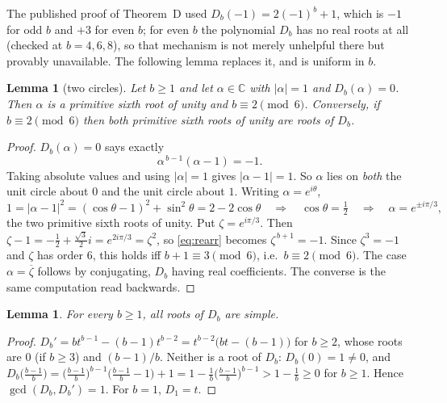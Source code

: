 \documentclass[11pt]{article}
\newtheorem{lemma}[theorem]{Lemma}
\theoremstyle{definition}
\newcommand{\CC}{\mathbb{C}}
\begin{document}
The published proof of Theorem~D used $D_b(-1)=2(-1)^b+1$, which is $-1$ for odd $b$ and $+3$ for
even $b$; for even $b$ the polynomial $D_b$ has no real roots at all (checked at $b=4,6,8$), so
that mechanism is not merely unhelpful there but provably unavailable. The following lemma replaces
it, and is uniform in $b$.

\begin{lemma}[two circles]\label{lem:twocircles}
Let $b\ge1$ and let $\alpha\in\CC$ with $|\alpha|=1$ and $D_b(\alpha)=0$. Then $\alpha$ is a
primitive sixth root of unity and $b\equiv2\pmod6$. Conversely, if $b\equiv2\pmod6$ then both
primitive sixth roots of unity are roots of $D_b$.
\end{lemma}

\begin{proof}
$D_b(\alpha)=0$ says exactly
\begin{equation}\label{eq:rearr}
  \alpha^{\,b-1}(\alpha-1)=-1 .
\end{equation}
Taking absolute values and using $|\alpha|=1$ gives $|\alpha-1|=1$. So $\alpha$ lies on
\emph{both} the unit circle about $0$ and the unit circle about $1$. Writing $\alpha=e^{i\theta}$,
\[
  1=|\alpha-1|^{2}=(\cos\theta-1)^2+\sin^2\theta=2-2\cos\theta
  \quad\Longrightarrow\quad \cos\theta=\tfrac12
  \quad\Longrightarrow\quad \alpha=e^{\pm i\pi/3},
\]
the two primitive sixth roots of unity. Put $\zeta=e^{i\pi/3}$. Then
$\zeta-1=-\tfrac12+\tfrac{\sqrt3}{2}i=e^{2i\pi/3}=\zeta^{2}$, so \eqref{eq:rearr} becomes
$\zeta^{\,b+1}=-1$. Since $\zeta^{3}=-1$ and $\zeta$ has order $6$, this holds iff
$b+1\equiv3\pmod 6$, i.e.\ $b\equiv2\pmod6$. The case $\alpha=\overline{\zeta}$ follows by
conjugating, $D_b$ having real coefficients. The converse is the same computation read backwards.
\end{proof}

\begin{lemma}\label{lem:simple}
For every $b\ge1$, all roots of $D_b$ are simple.
\end{lemma}

\begin{proof}
$D_b'=bt^{b-1}-(b-1)t^{b-2}=t^{b-2}\bigl(bt-(b-1)\bigr)$ for $b\ge2$, whose roots are $0$ (if
$b\ge3$) and $(b-1)/b$. Neither is a root of $D_b$: $D_b(0)=1\ne0$, and
$D_b\bigl(\tfrac{b-1}{b}\bigr)=\bigl(\tfrac{b-1}{b}\bigr)^{b-1}\bigl(\tfrac{b-1}{b}-1\bigr)+1
=1-\tfrac1b\bigl(\tfrac{b-1}{b}\bigr)^{b-1}>1-\tfrac1b\ge0$ for $b\ge1$. Hence
$\gcd(D_b,D_b')=1$. For $b=1$, $D_1=t$.
\end{proof}
\end{document}
